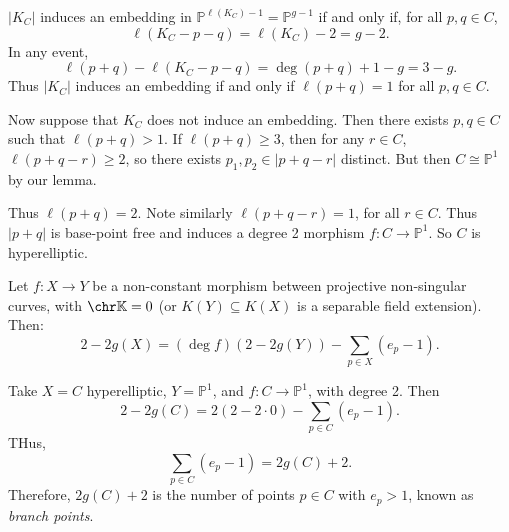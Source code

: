\documentclass[12pt]{article}
\begin{document}
\begin{proofbox}
	$|K_C|$ induces an embedding in $\mathbb{P}^{\ell(K_C) - 1} = \mathbb{P}^{g - 1}$ if and only if, for all $p, q \in C$,
	\[
	\ell(K_C - p - q) = \ell(K_C) - 2 = g - 2.
	\]
	In any event,
	\[
	\ell(p + q) - \ell(K_C - p - q) = \deg(p + q) + 1 - g = 3 - g.
	\]
	Thus $|K_C|$ induces an embedding if and only if $\ell(p + q) = 1$ for all $p, q \in C$.

	Now suppose that $K_C$ does not induce an embedding. Then there exists $p, q \in C$ such that $\ell(p + q) > 1$. If $\ell(p + q) \geq 3$, then for any $r \in C$, $\ell(p + q - r) \geq 2$, so there exists $p_1, p_2 \in |p + q - r|$ distinct. But then $C \cong \mathbb{P}^1$ by our lemma.

	Thus $\ell(p + q) = 2$. Note similarly $\ell(p + q - r) = 1$, for all $r \in C$. Thus $|p + q|$ is base-point free and induces a degree 2 morphism $f : C \to \mathbb{P}^1$. So $C$ is hyperelliptic.
\end{proofbox}

\begin{theorem}
	Let $f : X \to Y$ be a non-constant morphism between projective non-singular curves, with $\chr \mathbb{K} = 0$ (or $K(Y) \subseteq K(X)$ is a separable field extension). Then:
	\[
	2 - 2 g(X) = (\deg f)(2 - 2 g(Y)) - \sum_{p \in X} (e_p - 1).
	\]
\end{theorem}

\begin{exbox}
	Take $X = C$ hyperelliptic, $Y = \mathbb{P}^1$, and $f : C \to \mathbb{P}^1$, with degree 2. Then
	\[
	2 - 2 g(C) = 2 (2 - 2 \cdot 0) - \sum_{p \in C}(e_p - 1).
	\]
	THus,
	\[
	\sum_{p \in C} (e_p - 1) = 2 g(C) + 2.
	\]
	Therefore, $2 g(C) + 2$ is the number of points $p \in C$ with $e_p > 1$, known as \emph{branch points}.
\end{exbox}


\newpage

\printindex
\end{document}
